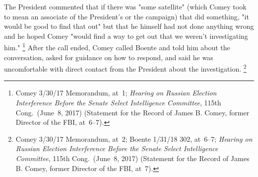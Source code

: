 The President commented that if there was "some satellite" (which Comey took to mean an associate of the President's or the campaign) that did something, "it would be good to find that out" but that he himself had not done anything wrong and he hoped Comey "would find a way to get out that we weren't investigating him."%
\footnote{Comey 3/30/17 Memorandum, at~1;
\textit{Hearing on Russian Election Interference Before the Senate Select Intelligence Committee}, 115th Cong.\ (June~8, 2017) (Statement for the Record of James B. Comey, former Director of the FBI, at~6--7).}
After the call ended, Comey called Boente and told him about the conversation, asked for guidance on how to respond, and said he was uncomfortable with direct contact from the President about the investigation.%
\footnote{Comey 3/30/17 Memorandum, at~2;
Boente 1/31/18 302, at~6--7;
\textit{Hearing on Russian Election Interference Before the Senate Select Intelligence Committee}, 115th Cong.\ (June~8, 2017) (Statement for the Record of James B. Comey, former Director of the FBI, at~7).}

